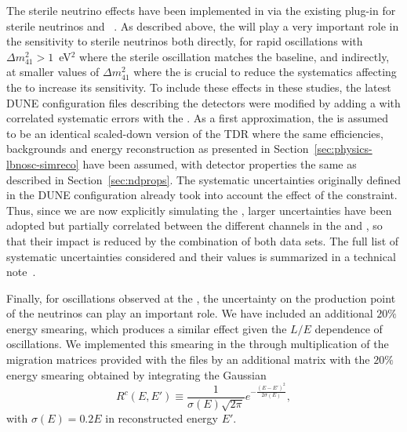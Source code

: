 The sterile neutrino effects have been implemented in   via the existing plug-in for sterile neutrinos and ~\cite{Joachim}. As described above, the  will play a very important role in the sensitivity to sterile neutrinos both directly, for rapid oscillations with $\Delta m_{41}^2 > 1$~eV$^2$ where the sterile oscillation matches the  baseline, and indirectly, at smaller values of $\Delta m_{41}^2$ where the  is crucial to reduce the systematics affecting the  to increase its sensitivity. To include these  effects in these studies, the latest  DUNE  configuration files describing the detectors were modified by adding a  with correlated systematic errors with the . As a first approximation, the  is assumed to be an identical scaled-down version of the TDR  where the same efficiencies, backgrounds and energy reconstruction as presented in Section~\ref{sec:physics-lbnosc-simreco} have been assumed, with detector properties the same as described in Section~\ref{sec:ndprops}. The systematic uncertainties originally defined in the  DUNE  configuration already took into account the effect of the  constraint. Thus, since we are now explicitly simulating the , larger uncertainties have been adopted but partially correlated between the different channels in the  and , so that their impact is reduced by the combination of both data sets. The full list of systematic uncertainties considered and their values is summarized in a technical note~\cite{ref:dune-sterile-note}.

Finally, for oscillations observed at the , the uncertainty on the production point of the neutrinos can play an important role. We have included an additional $20\%$ energy smearing, which produces a similar effect given the $L/E$ dependence of oscillations. We implemented this smearing in the  through multiplication of the migration matrices provided with the  files by an additional matrix with the $20\%$ energy smearing obtained by integrating the Gaussian
\begin{equation}
R^c(E,E')\equiv\frac{1}{\sigma(E)\sqrt{2\pi}}e^{-\frac{(E-E')^2}{2\sigma(E)}},
\label{R_mat}
\end{equation}
with $\sigma(E)=0.2 E$ in reconstructed energy $E'$.

